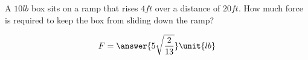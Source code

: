 \documentclass{ximera}
\author{Gregory Hartman \and Matthew Carr}
\begin{document}
\begin{exercise}




A $10\unit{lb}$ box sits on a ramp that rises $4\unit{ft}$ over a distance of $20\unit{ft}$. How much force is required to keep the box from sliding down the ramp?
\begin{prompt}
\[
F=\answer{5\sqrt{\frac{2}{13}}}\unit{lb}
\]
\end{prompt}

\end{exercise}
\end{document}
